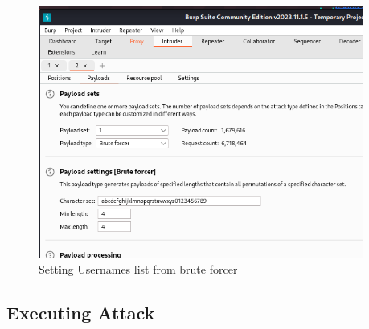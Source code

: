 \documentclass[11pt]{article}
\begin{document}

\begin{figure}[H]
    \centering
    \includegraphics[width=0.95\textwidth]{burpsuite (8).png}
    \caption{Setting Usernames list from brute forcer}
    \label{fig:1}
\end{figure}
\subsection{Executing Attack}



\end{document}
